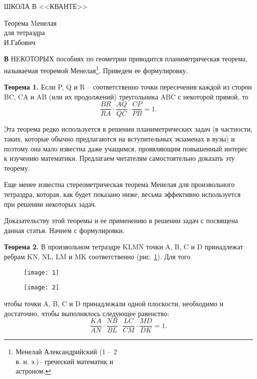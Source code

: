 \begin{center}
	\LARGE ШКОЛА В <<КВАНТЕ>>
	\noindent{\rule{0.9\paperwidth}{0.4pt}}	
\end{center}

\begin{multicols}{3}
	
	\begin{minipage}[t]{8cm}
		\begin{center}
			\Huge Теорема Mенелая\\ для тетраэдра\\
			\large И.Габович
		\end{center}
		\vspace{5mm}
	\end{minipage}
	
	\lettrine{\textbf{В}}{} НEКОТОРЫХ  пособиях по геометрии приводится планиметрическая теорема, называемая теоремой Менелая\footnote{Менелай Александрийский (1 -- 2\\ в. н. э.)-- греческий математик и\\ астроном.}. Приведем ее формулировку.
	
	\textbf{Теорема 1.} Если P, Q и R -- соответственно точки пересечения каждой из сторон BC, CA и AB (или их продолжений) треугольника ABC с некоторой прямой, то
	$$\frac{BR}{RA} \cdot \frac{AQ}{QC} \cdot \frac{CP}{PB} = 1.$$
	
	Эта теорема редко используется в решении планиметрических задач (в частности, таких, которые обычно предлагаются на вступительных экзаменах в вузы) и поэтому она мало известна даже учащимся, проявляющим повышенный интерес к изучению математики. Предлагаем читателям самостоятельно доказать эту теорему.
	
	Еще менее известна стереометрическая теорема Менелая для произвольного тетраэдра, которая, как будет показано ниже, весьма эффективно используется при решении некоторых задач.
	
	Доказательству этой теоремы и ее применению в решении задач с посвящена данная статья. Начнем с формулировки.
	
	\textbf{Теорема 2.} В произвольном тетраэдре KLMN точки A, B, C и D принадлежат ребрам KN, NL, LM и MK соответственно (рис. \ref{1}). Для того
	\begin{figure}[H]
		\begin{minipage}{\linewidth}
			\centering
			\texttt{[image: 1]}
			\caption{}
			\label{1}
		\end{minipage}
	\end{figure}
	\begin{figure}[H]
		\begin{minipage}{\linewidth}
				\centering
				\texttt{[image: 2]}
				\caption{}
				\label{2}
			\end{minipage}
	\end{figure}
	чтобы точки A, B, C и D принадлежали одной плоскости, необходимо и достаточно, чтобы выполнялось следующее равенство:
	\begin{equation}
			\frac{KA}{AN} \cdot \frac{NB}{BL} \cdot \frac{LC}{CM} \cdot \frac{MD}{DK} = 1.
			\label{eq1}
		\end{equation}
	

\end{multicols}
